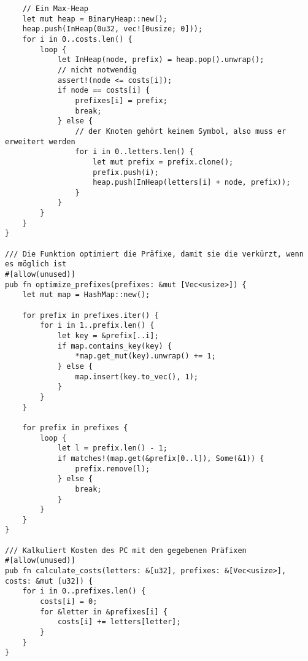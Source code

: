 \begin{lstlisting}
    // Ein Max-Heap
    let mut heap = BinaryHeap::new();
    heap.push(InHeap(0u32, vec![0usize; 0]));
    for i in 0..costs.len() {
        loop {
            let InHeap(node, prefix) = heap.pop().unwrap();
            // nicht notwendig
            assert!(node <= costs[i]);
            if node == costs[i] {
                prefixes[i] = prefix;
                break;
            } else {
                // der Knoten gehört keinem Symbol, also muss er erweitert werden
                for i in 0..letters.len() {
                    let mut prefix = prefix.clone();
                    prefix.push(i);
                    heap.push(InHeap(letters[i] + node, prefix));
                }
            }
        }
    }
}

/// Die Funktion optimiert die Präfixe, damit sie die verkürzt, wenn es möglich ist
#[allow(unused)]
pub fn optimize_prefixes(prefixes: &mut [Vec<usize>]) {
    let mut map = HashMap::new();

    for prefix in prefixes.iter() {
        for i in 1..prefix.len() {
            let key = &prefix[..i];
            if map.contains_key(key) {
                *map.get_mut(key).unwrap() += 1;
            } else {
                map.insert(key.to_vec(), 1);
            }
        }
    }

    for prefix in prefixes {
        loop {
            let l = prefix.len() - 1;
            if matches!(map.get(&prefix[0..l]), Some(&1)) {
                prefix.remove(l);
            } else {
                break;
            }
        }
    }
}

/// Kalkuliert Kosten des PC mit den gegebenen Präfixen
#[allow(unused)]
pub fn calculate_costs(letters: &[u32], prefixes: &[Vec<usize>], costs: &mut [u32]) {
    for i in 0..prefixes.len() {
        costs[i] = 0;
        for &letter in &prefixes[i] {
            costs[i] += letters[letter];
        }
    }
}
\end{lstlisting}
